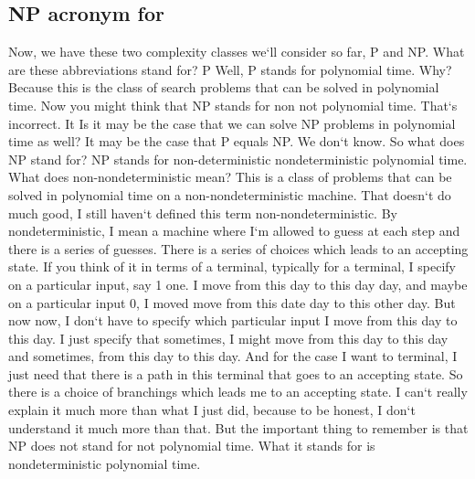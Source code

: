 \subsection{NP acronym for}
Now, we have these two complexity classes we`ll consider so far, P and NP\@.
What are these abbreviations stand for? P Well, P stands for polynomial time.
Why? Because this is the class of search problems that can be solved in polynomial time.
Now you might think that NP stands for non not polynomial time.
That`s incorrect.
It Is it may be the case that we can solve NP problems in polynomial time as well? It may be the case that P equals NP\@.
We don`t know.
So what does NP stand for? NP stands for non-deterministic nondeterministic polynomial time.
What does non-nondeterministic mean? This is a class of problems that can be solved in polynomial time on a non-nondeterministic machine.
That doesn`t do much good, I still haven`t defined this term non-nondeterministic.
By nondeterministic, I mean a machine where I`m allowed to guess at each step and there is a series of guesses.
There is a series of choices which leads to an accepting state.
If you think of it in terms of a terminal, typically for a terminal, I specify on a particular input, say 1 one.
I move from this day to this day day, and maybe on a particular input 0, I moved move from this date day to this other day.
But now now, I don`t have to specify which particular input I move from this day to this day.
I just specify that sometimes, I might move from this day to this day and sometimes, from this day to this day.
And for the case I want to terminal, I just need that there is a path in this terminal that goes to an accepting state.
So there is a choice of branchings which leads me to an accepting state.
I can`t really explain it much more than what I just did, because to be honest, I don`t understand it much more than that.
But the important thing to remember is that NP does not stand for not polynomial time.
What it stands for is nondeterministic polynomial time.

